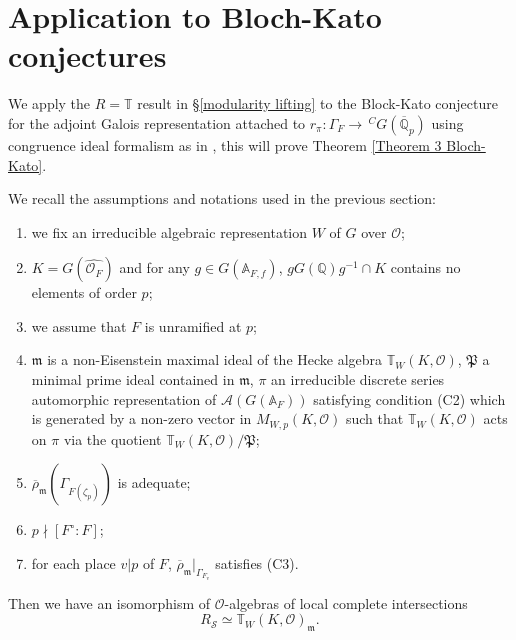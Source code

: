 \documentclass[12pt,oneside,reqno]{amsart}
\newcommand{\A}{\mathbb{A}}
\newcommand{\Q}{\mathbb{Q}}
\theoremstyle{plain}
\begin{document}
	
	
	\section{Application to Bloch-Kato conjectures}\label{Application to Bloch-Kato conjectures}
	We apply the $R=\mathbb{T}$ result in §\ref{modularity lifting} to the Block-Kato conjecture for the adjoint Galois representation attached to $r_{\pi}\colon\Gamma_F\to\,^CG(\overline{\mathbb{Q}}_p)$ using congruence ideal formalism as in \cite[§8]{HidaTilouine2020}, this will prove Theorem \ref{Theorem 3 Bloch-Kato}.
	
	
	
	
	We recall the assumptions and notations used in the previous section:
	\begin{enumerate}
		\item 
		we fix an irreducible algebraic representation $W$ of $G$ over $\mathcal{O}$;
		
		
		
		\item 
		$K=G(\widehat{\mathcal{O}_F})$ and for any $g\in G(\A_{F,f})$, $gG(\Q)g^{-1}\cap K$ contains no elements of order $p$;
		
		
		
		\item 
		we assume that $F$ is unramified at $p$; 
		
		
		
		\item 
		$\mathfrak{m}$ is a non-Eisenstein maximal ideal of the Hecke algebra $\mathbb{T}_W(K,\mathcal{O})$, $\mathfrak{P}$ a minimal prime ideal contained in $\mathfrak{m}$, $\pi$ an irreducible discrete series automorphic representation of $\mathcal{A}(G(\mathbb{A}_F))$ satisfying condition (C2) which is generated by a non-zero vector in $M_{W,p}(K,\mathcal{O})$ such that $\mathbb{T}_W(K,\mathcal{O})$ acts on $\pi$ via the quotient $\mathbb{T}_W(K,\mathcal{O})/\mathfrak{P}$;
		
		
		\item 
		$\overline{\rho}_{\mathfrak{m}}(\Gamma_{F(\zeta_p)})$ is adequate;
		
		
		\item 
		$p\nmid[F^\circ:F]$;
		
		
		\item 
		for each place $v|p$ of $F$, $\overline{\rho}_{\mathfrak{m}}|_{\Gamma_{F_v}}$ satisfies (C3).
	\end{enumerate}
	Then we have an isomorphism of $\mathcal{O}$-algebras of local complete intersections
	\[
	R_\mathcal{S}\simeq\mathbb{T}_W(K,\mathcal{O})_{\mathfrak{m}}.
	\]
	
\end{document}

